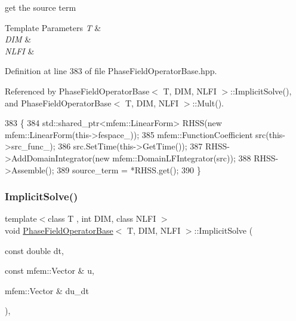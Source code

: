 get the source term 


\begin{DoxyTemplParams}{Template Parameters}
{\em T} & \\
\hline
{\em D\+IM} & \\
\hline
{\em N\+L\+FI} & \\
\hline
\end{DoxyTemplParams}


Definition at line 383 of file Phase\+Field\+Operator\+Base.\+hpp.



Referenced by Phase\+Field\+Operator\+Base$<$ T, D\+I\+M, N\+L\+F\+I $>$\+::\+Implicit\+Solve(), and Phase\+Field\+Operator\+Base$<$ T, D\+I\+M, N\+L\+F\+I $>$\+::\+Mult().


\begin{DoxyCode}
383                                                                                         \{
384   std::shared\_ptr<mfem::LinearForm> RHSS(\textcolor{keyword}{new} mfem::LinearForm(this->fespace\_));
385   mfem::FunctionCoefficient src(this->src\_func\_);
386   src.SetTime(this->GetTime());
387   RHSS->AddDomainIntegrator(\textcolor{keyword}{new} mfem::DomainLFIntegrator(src));
388   RHSS->Assemble();
389   source\_term = *RHSS.get();
390 \}
\end{DoxyCode}
\mbox{\label{classPhaseFieldOperatorBase_ac1be84d201e35ba329090cdda6a4bfc5}} 
\subsubsection{\texorpdfstring{Implicit\+Solve()}{ImplicitSolve()}}
{\footnotesize\ttfamily template$<$class T , int D\+IM, class N\+L\+FI $>$ \\
void \hyperlink{classPhaseFieldOperatorBase}{Phase\+Field\+Operator\+Base}$<$ T, D\+IM, N\+L\+FI $>$\+::Implicit\+Solve (\begin{DoxyParamCaption}\item[{const double}]{dt,  }\item[{const mfem\+::\+Vector \&}]{u,  }\item[{mfem\+::\+Vector \&}]{du\+\_\+dt }\end{DoxyParamCaption})\hspace{0.3cm}{\ttfamily [virtual]}, {\ttfamily [inherited]}}




